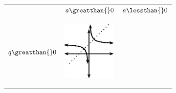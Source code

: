 \setlength\mytablespace{6\tabcolsep}
\addtolength\mytablespace{4\arrayrulewidth}
\setlength\mytablewidth{\linewidth}
\setlength\mytableroom{\mytablewidth}
\addtolength\mytableroom{-\mytablespace}
\setlength\myfixedwidth{0pt}
\setlength\mystarwidth{\mytableroom}
\addtolength\mystarwidth{-\myfixedwidth}
\divide{}
\begin{center}
\label{m39341*uid151}
\noindent
{}
\tablelasttail{}
\begin{xtabular*}{\mytablewidth}[t]{|p{10\mystarwidth}|p{10\mystarwidth}|p{10\mystarwidth}|}\hline
&
    $a\greatthan{}0$
    &
    $a\lessthan{}0$
\tabularnewline{}
    $q\greatthan{}0$
    &
\setcounter{subfigure}{0}
\label{m39341*id246931}
\begin{center}
\label{m39341*id246931!!!underscore!!!media}\label{m39341*id246931!!!underscore!!!printimage}\includegraphics[width=100px]{col11306.imgs/m39341_MG10C11_022.png} %

\end{center}
\end{xtabular*}
\end{center}
